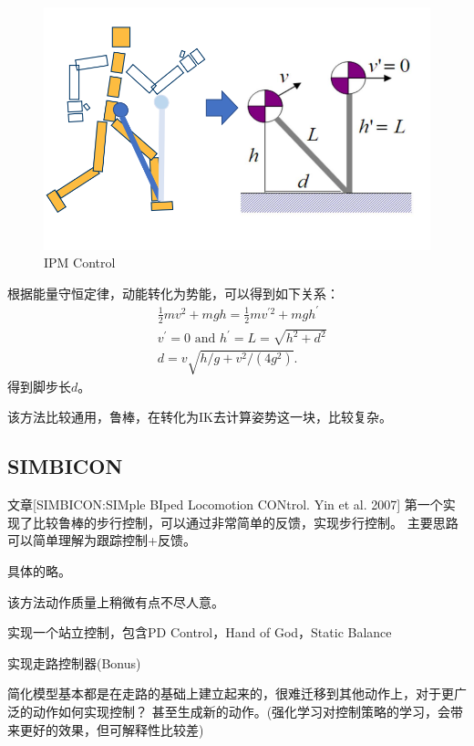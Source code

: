 \documentclass[lang=cn,newtx,10pt,scheme=chinese]{elegantbook}
\begin{document}
\begin{figure}[htbp]
  \centering
  \includegraphics[totalheight=1.6in]{"./image/IPM-Control.png"}
  \caption{IPM Control} \label{fig:IPM-Control}
\end{figure}

根据能量守恒定律，动能转化为势能，可以得到如下关系：
\begin{equation}
  \begin{aligned}
  & \frac{1}{2} m v^2+m g h=\frac{1}{2} m v^{\prime 2}+m g h^{\prime} \\
  & v^{\prime}=0 \text { and } h^{\prime}=L=\sqrt{h^2+d^2} \\
  & d=v \sqrt{h / g+v^2 /\left(4 g^2\right)} .
  \end{aligned}
\end{equation}
得到脚步长$d$。

该方法比较通用，鲁棒，在转化为IK去计算姿势这一块，比较复杂。

\subsection{SIMBICON}
文章[SIMBICON:SIMple BIped Locomotion CONtrol. Yin et al. 2007]
第一个实现了比较鲁棒的步行控制，可以通过非常简单的反馈，实现步行控制。
主要思路可以简单理解为跟踪控制+反馈。

具体的略。

该方法动作质量上稍微有点不尽人意。

\begin{problemset}
  \item 实现一个站立控制，包含PD Control，Hand of God，Static Balance
  \item 实现走路控制器(Bonus)
  \item 简化模型基本都是在走路的基础上建立起来的，很难迁移到其他动作上，对于更广泛的动作如何实现控制？
  甚至生成新的动作。(强化学习对控制策略的学习，会带来更好的效果，但可解释性比较差)
\end{problemset}
\end{document}
